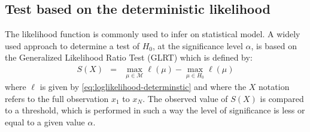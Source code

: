 \documentclass[graybox]{svmult/styles/svmult}
\def\bun{\mathds{1}}
\begin{document}
 \subsection{Test based on the deterministic likelihood}
The likelihood function is commonly used to infer on statistical model.  A widely used approach to determine a test of $H_{0}$, at the significance level $\alpha$,  is based on the Generalized Likelihood Ratio Test (GLRT) which is defined by:
\begin{eqnarray}
\label{eq:defGLRT}
S(X) &=&\max_{\mu\in\mathcal{M}}\ell(\mu) - \max_{\mu\in H_{0}}\ell(\mu)
\end{eqnarray}
where $\ell$ is given by \eqref{eq:loglikelihood-determinstic} and where the $X$ notation refers to the full observation $x_{1}$ to $x_{N}$. The observed value of $S(X)$ is compared to a threshold, which is performed in such a way the level of significance is less or equal to a given value $\alpha$.

\end{document}
